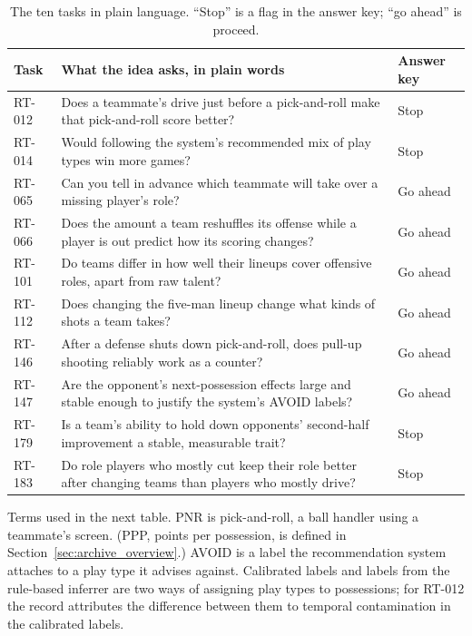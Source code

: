 \documentclass[11pt]{article}
\begin{document}
\begin{table}[ht]
\centering
\caption{The ten tasks in plain language. ``Stop'' is a flag in the answer key; ``go ahead'' is proceed.}
\label{tab:tasks_plain}
\small
\begin{tabularx}{\linewidth}{lXl}
\toprule
Task & What the idea asks, in plain words & Answer key \\
\midrule
RT-012 & Does a teammate's drive just before a pick-and-roll make that pick-and-roll score better? & Stop \\
RT-014 & Would following the system's recommended mix of play types win more games? & Stop \\
RT-065 & Can you tell in advance which teammate will take over a missing player's role? & Go ahead \\
RT-066 & Does the amount a team reshuffles its offense while a player is out predict how its scoring changes? & Go ahead \\
RT-101 & Do teams differ in how well their lineups cover offensive roles, apart from raw talent? & Go ahead \\
RT-112 & Does changing the five-man lineup change what kinds of shots a team takes? & Go ahead \\
RT-146 & After a defense shuts down pick-and-roll, does pull-up shooting reliably work as a counter? & Go ahead \\
RT-147 & Are the opponent's next-possession effects large and stable enough to justify the system's AVOID labels? & Go ahead \\
RT-179 & Is a team's ability to hold down opponents' second-half improvement a stable, measurable trait? & Stop \\
RT-183 & Do role players who mostly cut keep their role better after changing teams than players who mostly drive? & Stop \\
\bottomrule
\end{tabularx}

\vspace{0.4em}
\begin{minipage}{0.92\linewidth}\footnotesize
Terms used in the next table. PNR is pick-and-roll, a ball handler using a teammate's screen. (PPP, points per possession, is defined in Section~\ref{sec:archive_overview}.) AVOID is a label the recommendation system attaches to a play type it advises against. Calibrated labels and labels from the rule-based inferrer are two ways of assigning play types to possessions; for RT-012 the record attributes the difference between them to temporal contamination in the calibrated labels.
\end{minipage}
\end{table}
\end{document}
